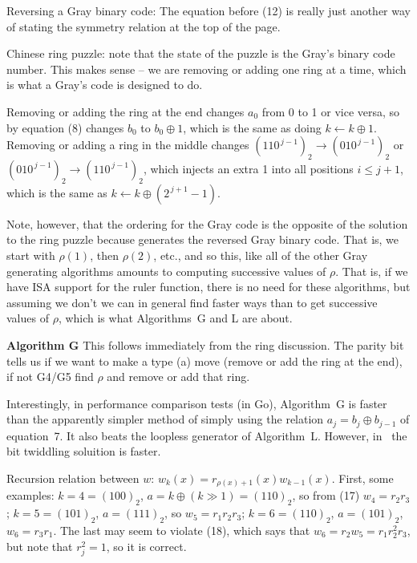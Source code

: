  Reversing a Gray binary code: The equation
before (12) is really just another way of stating the symmetry
relation at the top of the page.

 Chinese ring puzzle: note that the state
of the puzzle is the Gray's binary code number.  This makes sense --
we are removing or adding one ring at a time, which is what
a Gray's code is designed to do.

Removing or adding the ring at the end changes $a_0$ from
0 to 1 or vice versa, so by equation (8) changes $b_0$ to $b_0 \oplus 1$,
which is the same as doing $k \gets k \oplus 1$.  Removing or
adding a ring in the middle changes $\left(110^{\,j-1}\right)_2 \rightarrow
\left(010^{\,j-1}\right)_2$ or $\left(010^{\,j-1}\right)_2 \rightarrow
\left(110^{\,j-1}\right)_2$, which injects an extra 1 into all positions
$i \le j+1$, which is the same as $k \gets k \oplus \left(2^{\,j+1} - 1\right)$.

Note, however, that the ordering for the Gray code 
is the opposite of the solution to the ring puzzle
because generates the reversed Gray binary code.  That is,
we start with $\rho\left(1\right)$, then $\rho\left(2\right)$, etc.,
and so this, like all of the other Gray generating algorithms
amounts to computing successive values of $\rho$.  That is,
if we have ISA support for the ruler function, there is no need
for these algorithms, but assuming we don't we can in general
find faster ways than to get successive values of $\rho$, which
is what Algorithms~G and L are about.

 {\bf Algorithm G}\hfil\break
This follows immediately from the ring discussion.  
The parity bit tells us if we want to make a type (a) move (remove or add the ring
at the end), if not G4/G5 find $\rho$ and remove or add that ring.

Interestingly, in performance comparison tests (in Go), Algorithm~G is faster
than the apparently simpler method of simply using the relation
$a_j = b_j \oplus b_{j-1}$ of equation~7.  It also beats the loopless
generator of Algorithm~L.  However, in \CC\ the bit twiddling soluition
is faster.

 Recursion relation between $w$:
$w_k\left(x\right) = r_{\rho\left(x\right) + 1}\left(x\right) w_{k-1} \left(x\right)$.
First, some examples: $k = 4 = \left(1 0 0 \right)_2$, $a = k \oplus 
\left(k \gg 1\right) = \left(1 1 0 \right)_2$, so from (17)
$w_4 = r_2 r_3$; $k = 5 = \left(1 0 1\right)_2$, $a = \left( 1 1 1 \right)_2$,
so $w_5 = r_1 r_2 r_3$; $k = 6 = \left( 1 1 0 \right)_2$,
$a = \left(1 0 1\right)_2$, $w_6 = r_3 r_1$.  The last may seem to
violate (18), which says that $w_6 = r_2 w_5 = r_1 r_2^2 r_3$, but
note that $r_j^2 = 1$, so it is correct.

